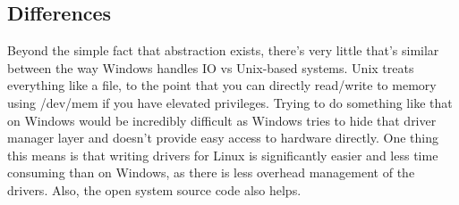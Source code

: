 \subsection{Differences}
Beyond the simple fact that abstraction exists, there's very little that's similar between the way Windows handles IO vs Unix-based systems. Unix treats everything like a file, to the point that you can directly read/write to memory using /dev/mem if you have elevated privileges. Trying to do something like that on Windows would be incredibly difficult as Windows tries to hide that driver manager layer and doesn't provide easy access to hardware directly. One thing this means is that writing drivers for Linux is significantly easier and less time consuming than on Windows, as there is less overhead management of the drivers. Also, the open system source code also helps.
